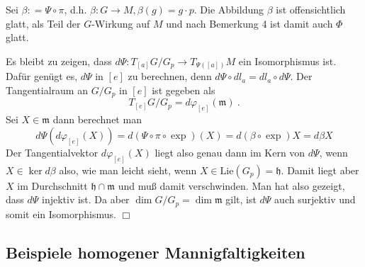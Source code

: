 \documentclass[12pt,a4paper]{article}
\def\Lie{\mathrm{Lie}}
\def\m{\mathfrak{m}}
\def\h{\mathfrak{h}}
\def\qed{\quad\hfill\ensuremath{\Box}}
\begin{document}
\medskip

Sei $\beta : = \Psi \circ \pi$, d.h. $\beta: G \rightarrow M, \beta(g) = g \cdot p$. Die Abbildung
$\beta$ ist offensichtlich glatt, als Teil der $G$-Wirkung auf $M$ und nach Bemerkung 4 ist damit
auch $\Phi$ glatt.

\medskip

Es bleibt zu zeigen, dass $d\Psi : T_{[a]}G/G_p \rightarrow  T_{\Psi([a])}M$ ein Isomorphismus ist.
Daf\"ur gen\"ugt es, $d\Psi$ in $[e]$ zu berechnen, denn
$d\Psi \circ dl_a = dl_a \circ d\Psi$. Der Tangentialraum an $G/G_p$ in $[e]$ ist gegeben als
$$
T_{[e]}G/G_p = d\varphi_{[e]}(\m) \ .
$$
Sei $X\in \m$ dann berechnet man
$$
d\Psi (d\varphi_{[e]}(X)) = d(\Psi \circ \pi \circ \exp)(X) = d(\beta \circ \exp)X = d\beta X
$$
Der Tangentialvektor $d\varphi_{[e]}(X)$ liegt also genau dann im Kern von $d\Psi$, wenn
$X \in \ker d\beta$ also, wie man leicht sieht, wenn $X\in \Lie(G_p) = \h$. Damit liegt aber
$X$ im Durchschnitt $\h \cap \m$ und mu\ss{} damit verschwinden. Man hat also gezeigt, dass
$d\Psi$ injektiv ist. Da aber $\dim G/G_p = \dim \m$ gilt, ist $d\Psi$ auch surjektiv und
somit ein Isomorphismus.
\qed


\bigskip

\subsection{Beispiele homogener Mannigfaltigkeiten}

\bigskip
\end{document}
